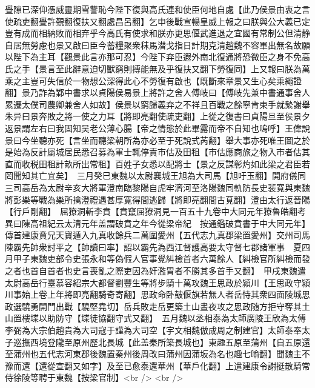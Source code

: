 舋隙已深仰憑威靈期雪讐恥今陛下復與高氏連和使臣何地自處【此乃侯景由衷之言使疏吏翻舋許覲翻復扶又翻處昌呂翻】乞申後戰宣暢皇威上報之曰朕與公大義已定豈有成而相納敗而相弃乎今高氏有使求和朕亦更思偃武進退之宜國有常制公但清静自居無勞慮也景又啟曰臣今蓄糧聚衆秣馬潜戈指日計期克清趙魏不容軍出無名故願以陛下為主耳【觀景此言亦那可忍】今陛下弃臣遐外南北復通將恐微臣之身不免高氏之手【景言至此辭意迫切獸窮則搏能無及乎復扶又翻下勞復同】上又報曰朕為萬乘之主豈可失信於一物想公深得此心不勞復有啟也【既斷來章景又生心矣乘繩證翻】景乃詐為鄴中書求以貞陽侯易景上將許之舍人傅岐曰【傅岐先兼中書通事舍人累遷太僕司農卿兼舍人如故】侯景以窮歸義弃之不祥且百戰之餘寧肯束手就縶謝舉朱异曰景奔敗之將一使之力耳【將即亮翻使疏吏翻】上從之復書曰貞陽旦至侯景夕返景謂左右曰我固知吴老公薄心腸【帝之情態於此畢露而帝不自知也嗚呼】王偉說景曰今坐聽亦死【言坐而聽梁朝所為亦必至于死說式芮翻】舉大事亦死唯王圖之於是始為反計屬城居民悉召募為軍士輒停責市估及田租【市估應商旅之物入市者估其直而收税田租計畝所出常租】百姓子女悉以配將士【景之反謀彰灼如此梁之君臣若罔聞知其亡宜矣】　三月癸巳東魏以太尉襄城王旭為大司馬【旭吁玉翻】開府儀同三司高岳為太尉辛亥大將軍澄南臨黎陽自虎牢濟河至洛陽魏同軌防長史裴寛與東魏將彭樂等戰為樂所擒澄禮遇甚厚寛得間逃歸【將即亮翻間古莧翻】澄由太行返晉陽【行戶剛翻】　屈獠洞斬李賁【賁竄屈獠洞見一百五十九卷中大同元年獠魯皓翻考異曰陳高祖紀云太清元年盖謂破賁之年今從梁帝紀　按通鑑破賁書于中大同元年】傳首建康賁兄天寶遁入九真收餘兵二萬圍愛州【五代志九真郡梁置愛州】交州司馬陳霸先帥衆討平之【帥讀曰率】詔以霸先為西江督護高要太守督七郡諸軍事　夏四月甲子東魏吏部令史張永和等偽假人官事覺糾檢首者六萬餘人【糾檢官所糾檢而發之者也首自首者也史言喪亂之際吏因為奸濫胃者不勝其多首手又翻】　甲戌東魏遣太尉高岳行臺慕容紹宗大都督劉豐生等將步騎十萬攻魏王思政於潁川【王思政守潁川事始上卷上年將即亮翻騎奇寄翻】思政命卧皷偃旗若無人者岳恃其衆四面陵城思政選驍勇開門出戰【驍堅堯切】岳兵敗走岳更築土山晝夜攻之思政随方拒守奪其土山置樓堞以助防守【堞徒協翻守式又翻】　五月魏以丞相泰為太師廣陵王欣為太傅李弼為大宗伯趙貴為大司寇于謹為大司空【宇文相魏倣成周之制建官】太師泰奉太子巡撫西境登隴至原州歷北長城【此盖秦所築長城也】東趣五原至蒲州【自五原還至蒲州也五代志河東郡後魏置秦州後周改曰蒲州因蒲坂為名也趣七喻翻】聞魏主不豫而還【還從宣翻又如字】及至已愈泰還華州【華戶化翻】上遣建康令謝挺散騎常侍徐陵等聘于東魏【按梁官制】<br />
<br />
